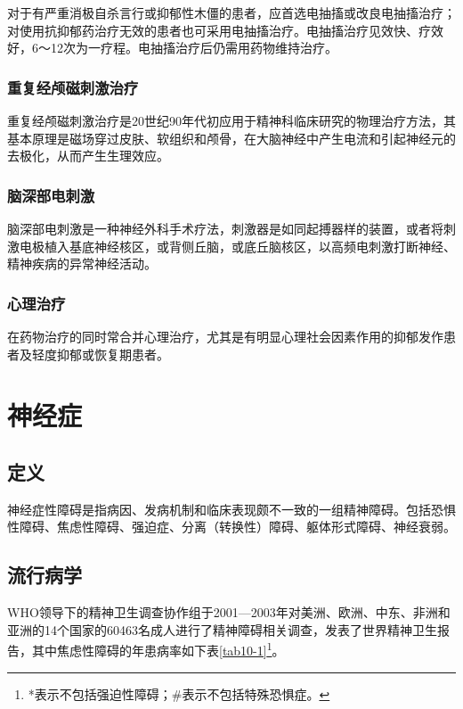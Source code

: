 对于有严重消极自杀言行或抑郁性木僵的患者，应首选电抽搐或改良电抽搐治疗；对使用抗抑郁药治疗无效的患者也可采用电抽搐治疗。电抽搐治疗见效快、疗效好，6～12次为一疗程。电抽搐治疗后仍需用药物维持治疗。

\subsubsection{重复经颅磁刺激治疗}

重复经颅磁刺激治疗是20世纪90年代初应用于精神科临床研究的物理治疗方法，其基本原理是磁场穿过皮肤、软组织和颅骨，在大脑神经中产生电流和引起神经元的去极化，从而产生生理效应。

\subsubsection{脑深部电刺激}

脑深部电刺激是一种神经外科手术疗法，刺激器是如同起搏器样的装置，或者将刺激电极植入基底神经核区，或背侧丘脑，或底丘脑核区，以高频电刺激打断神经、精神疾病的异常神经活动。

\subsubsection{心理治疗}

在药物治疗的同时常合并心理治疗，尤其是有明显心理社会因素作用的抑郁发作患者及轻度抑郁或恢复期患者。

\section{神经症}

\subsection{定义}

神经症性障碍是指病因、发病机制和临床表现颇不一致的一组精神障碍。包括恐惧性障碍、焦虑性障碍、强迫症、分离（转换性）障碍、躯体形式障碍、神经衰弱。

\subsection{流行病学}

WHO领导下的精神卫生调查协作组于2001---2003年对美洲、欧洲、中东、非洲和亚洲的14个国家的60463名成人进行了精神障碍相关调查，发表了世界精神卫生报告，其中焦虑性障碍的年患病率如下表\ref{tab10-1}\footnote{*表示不包括强迫性障碍；\#表示不包括特殊恐惧症。}。


